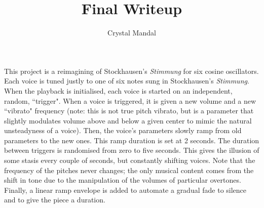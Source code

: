 \documentclass[12pt,letterpaper]{article}
\title{\vspace*{-72pt}Final Writeup}
\author{Crystal Mandal}
\date{}
\begin{document}
\maketitle

This project is a reimagining of Stockhausen's \textit{Stimmung} 
for six cosine oscillators. Each voice is tuned justly to one of 
six notes sung in Stockhausen's \textit{Stimmung}. When the playback 
is initialised, each voice is started on an independent, random, 
``trigger". When a voice is triggered, it is given a new volume and 
a new ``vibrato" frequency (note: this is not true pitch vibrato, but 
is a parameter that slightly modulates volume above and below a given 
center to mimic the natural unsteadyness of a voice). Then, the voice's 
parameters slowly ramp from old parameters to the new ones. This ramp 
duration is set at 2 seconds. The duration between triggers is randomised 
from zero to five seconds. This gives the illusion of some stasis every 
couple of seconds, but constantly shifting voices. Note that the frequency 
of the pitches never changes; the only musical content comes from the 
shift in tone due to the manipulation of the volumes of particular 
overtones. Finally, a linear ramp envelope is added to automate a 
gradual fade to silence and to give the piece a duration. 


\end{document}
